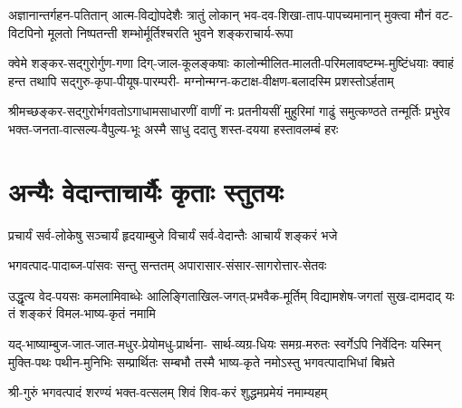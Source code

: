 
\fourlineindentedshloka
{अज्ञानान्तर्गहन-पतितान् आत्म-विद्योपदेशैः}
{त्रातुं लोकान् भव-दव-शिखा-ताप-पापच्यमानान्}
{मुक्त्वा मौनं वट-विटपिनो मूलतो निष्पतन्ती}
{शम्भोर्मूर्तिश्चरति भुवने शङ्कराचार्य-रूपा}


\fourlineindentedshloka
{क्वेमे शङ्कर-सद्गुरोर्गुण-गणा दिग्-जाल-कूलङ्कषाः}
{कालोन्मीलित-मालती-परिमलावष्टम्भ-मुष्टिंधयाः}
{क्वाहं हन्त तथापि सद्गुरु-कृपा-पीयूष-पारम्परी-}
{मग्नोन्मग्न-कटाक्ष-वीक्षण-बलादस्मि प्रशस्तोऽर्हताम्}


\fourlineindentedshloka
{श्रीमच्छङ्कर-सद्गुरोर्भगवतोऽगाधामसाधारणीं}
{वाणीं नः प्रतनीयसीं मुहुरिमां गाढुं समुत्कण्ठते}
{तन्मूर्तिः प्रभुरेव भक्त-जनता-वात्सल्य-वैपुल्य-भूः}
{अस्मै साधु ददातु शस्त-दयया हस्तावलम्बं हरः}



\section{अन्यैः वेदान्ताचार्यैः कृताः स्तुतयः}

\twolineshloka
{प्रचार्यं सर्व-लोकेषु सञ्चार्यं हृदयाम्बुजे}
{विचार्यं सर्व-वेदान्तैः आचार्यं शङ्करं भजे}


\twolineshloka
{भगवत्पाद-पादाब्ज-पांसवः सन्तु सन्ततम्}
{अपारासार-संसार-सागरोत्तार-सेतवः}


\fourlineindentedshloka
{उद्धृत्य वेद-पयसः कमलामिवाब्धेः}
{आलिङ्गिताखिल-जगत्-प्रभवैक-मूर्तिम्}
{विद्यामशेष-जगतां सुख-दामदाद् यः}
{तं शङ्करं विमल-भाष्य-कृतं नमामि}


\fourlineindentedshloka
{यद्-भाष्याम्बुज-जात-जात-मधुर-प्रेयोमधु-प्रार्थना-}
{सार्थ-व्यग्र-धियः समग्र-मरुतः स्वर्गेऽपि निर्वेदिनः}
{यस्मिन् मुक्ति-पथः पथीन-मुनिभिः सम्प्रार्थितः सम्बभौ}
{तस्मै भाष्य-कृते नमोऽस्तु भगवत्पादाभिधां बिभ्रते}


\twolineshloka
{श्री-गुरुं भगवत्पादं शरण्यं भक्त-वत्सलम्}
{शिवं शिव-करं शुद्धमप्रमेयं नमाम्यहम्}

